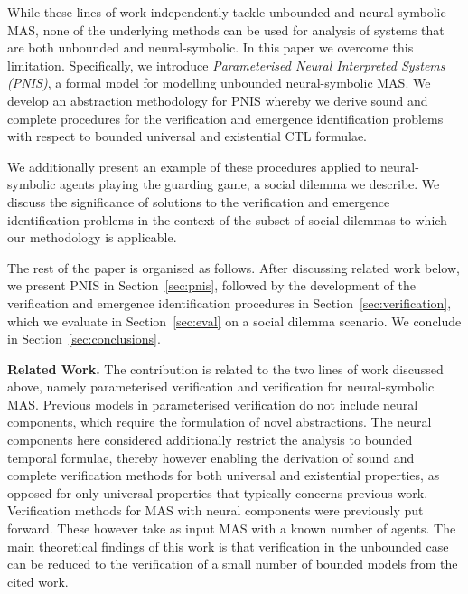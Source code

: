 While these lines of work independently tackle unbounded and neural-symbolic
MAS, none of the underlying methods can be used for analysis of systems that are
both unbounded and neural-symbolic.  In this paper we overcome this limitation.
Specifically, we introduce \emph{Parameterised Neural Interpreted Systems (PNIS)}, a
formal model
for modelling unbounded neural-symbolic MAS.  We develop an abstraction
methodology for PNIS whereby we derive sound and complete procedures for the
verification and emergence identification problems with respect to bounded
universal and existential CTL formulae.

We additionally present an example of these procedures applied to
neural-symbolic agents playing the guarding game, a social dilemma we describe.
We discuss the significance of solutions to the verification and emergence
identification problems in the context of the subset of social dilemmas to
which our methodology is applicable.


The rest of the paper is organised as follows. After discussing related work
below, we present PNIS in Section~\ref{sec:pnis}, followed by the development of
the verification and emergence identification procedures in
Section~\ref{sec:verification}, which we evaluate in Section~\ref{sec:eval}  on
a social dilemma scenario. We conclude in Section~\ref{sec:conclusions}.


{\bf Related Work.}  The contribution is related to the two lines of work
discussed above, namely parameterised verification and verification for
neural-symbolic MAS. Previous models in parameterised verification do not
include neural components, which require the formulation of novel abstractions.
The neural components here considered additionally restrict the analysis to
bounded temporal formulae, thereby however enabling the derivation of sound and
complete verification methods for both universal and existential properties, as
opposed for only universal properties that typically concerns previous work.
Verification methods for MAS with neural components were previously put forward.
These however take as input MAS with a known number of agents. The main
theoretical findings of this work is that verification in the unbounded
case can be reduced to the verification of a small number of bounded models from
the cited work.


